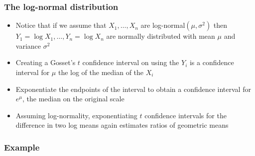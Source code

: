 \documentclass[aspectratio=169]{beamer}
\begin{document}
\begin{frame}\frametitle{The log-normal distribution}
\begin{itemize}
\item Notice that if we assume that $X_1,\ldots,X_n$ are 
   log-normal$(\mu,\sigma^2)$
  then $Y_1 = \log X_1,\ldots, Y_n = \log X_n$ are normally distributed
  with mean $\mu$ and variance $\sigma^2$
\item Creating a Gosset's $t$ confidence interval on using the $Y_i$
  is a confidence interval for $\mu$ the log of the median of the
  $X_i$
\item Exponentiate the endpoints of the interval to obtain a confidence interval
  for $e^\mu$, the median on the original scale
\item Assuming log-normality, exponentiating $t$ confidence intervals
  for the difference in two log means again estimates ratios of geometric
  means 
\end{itemize}
\end{frame}

\begin{frame}\frametitle{Example}
\end{frame}
\end{document}
